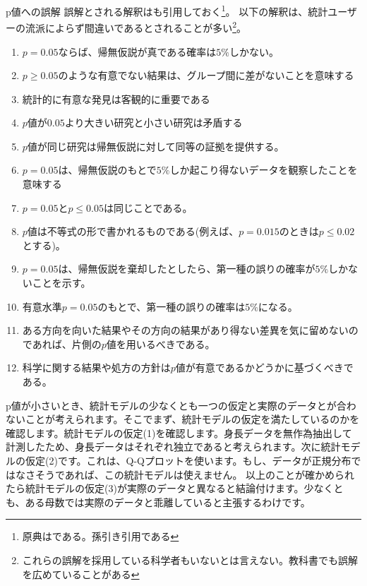 \begin{SMbox}{p値への誤解}
    誤解とされる解釈はも引用しておく\cite{idiot_statistics2014}\footnote{原典は\cite{GOODMAN2008135}である。孫引き引用である}。
    以下の解釈は、統計ユーザーの流派によらず間違いであるとされることが多い\footnote{これらの誤解を採用している科学者もいないとは言えない。教科書でも誤解を広めていることがある}。
    \begin{enumerate}
        \item $p=0.05$ならば、帰無仮説が真である確率は$5\%$しかない。
        \item $p\geq 0.05$のような有意でない結果は、グループ間に差がないことを意味する
        \item 統計的に有意な発見は客観的に重要である
        \item $p$値が$0.05$より大きい研究と小さい研究は矛盾する
        \item $p$値が同じ研究は帰無仮説に対して同等の証拠を提供する。
        \item $p=0.05$は、帰無仮説のもとで$5\%$しか起こり得ないデータを観察したことを意味する
        \item $p=0.05$と$p\leq 0.05$は同じことである。
        \item $p$値は不等式の形で書かれるものである(例えば、$p=0.015$のときは$p\leq 0.02$とする)。
        \item $p=0.05$は、帰無仮説を棄却したとしたら、第一種の誤りの確率が$5\%$しかないことを示す。
        \item 有意水準$p=0.05$のもとで、第一種の誤りの確率は$5\%$になる。
        \item ある方向を向いた結果やその方向の結果があり得ない差異を気に留めないのであれば、片側の$p$値を用いるべきである。
        \item 科学に関する結果や処方の方針は$p$値が有意であるかどうかに基づくべきである。
    \end{enumerate}
\end{SMbox}




p値が小さいとき、統計モデルの少なくとも一つの仮定と実際のデータとが合わないことが考えられます。そこでまず、統計モデルの仮定を満たしているのかを確認します。統計モデルの仮定(1)を確認します。身長データを無作為抽出して計測したため、身長データはそれぞれ独立であると考えられます。次に統計モデルの仮定(2)です。これは、Q-Qプロットを使います。もし、データが正規分布ではなさそうであれば、この統計モデルは使えません。
以上のことが確かめられたら統計モデルの仮定(3)が実際のデータと異なると結論付けます。少なくとも、ある母数では実際のデータと乖離していると主張するわけです。
\fi

